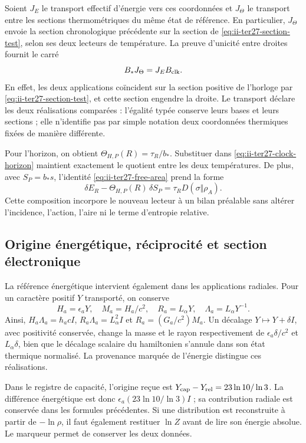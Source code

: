 Soient $J_E$ le transport effectif d’énergie vers ces coordonnées et
$J_\Theta$ le transport entre les sections thermométriques du même
état de référence. En particulier, $J_\Theta$ envoie la section
chronologique précédente sur la section de \eqref{eq:ii-ter27-section-test},
selon ses deux lecteurs de température. La preuve d’unicité entre droites
fournit le carré
\begin{equation}
 B_*J_\Theta=J_EB_{\rm clk}.
 \label{eq:ii-ter27-intertwiner}
\end{equation}
En effet, les deux applications coïncident sur la section positive de
l’horloge par \eqref{eq:ii-ter27-section-test}, et cette section engendre la droite.
Le transport déclare les deux réalisations comparées : l’égalité
typée conserve leurs bases et leurs sections ; elle n’identifie pas par simple
notation deux coordonnées thermiques fixées de manière différente.

Pour l’horizon, on obtient
$\Theta_{H,P}(R)=\tau_R/b_*$. Substituer dans
\eqref{eq:ii-ter27-clock-horizon} maintient exactement le quotient entre
les deux températures. De plus, avec $S_P=b_*s$, l’identité
\eqref{eq:ii-ter27-free-area} prend la forme
\[
 \delta E_R-\Theta_{H,P}(R)\,\delta S_P
 =\tau_RD(\sigma\Vert\rho_A).
\]
Cette composition incorpore le nouveau lecteur à un bilan préalable sans
altérer l’incidence, l’action, l’aire ni le terme d’entropie relative.

\subsection{Origine énergétique, réciprocité et section électronique}
\label{subsec:ii-ter27-electron}

La référence énergétique intervient également dans les applications radiales.
Pour un caractère positif $Y$ transporté, on conserve
\[
 H_a=\epsilon_aY,\quad M_a=H_a/c^2,\quad
 R_a=L_\alpha Y,\quad \Lambda_a=L_\alpha Y^{-1}.
\]
Ainsi, $H_a\Lambda_a=\hbar_acI$, $R_a\Lambda_a=L_\alpha^2I$ et
$R_a=(G_a/c^2)M_a$. Un décalage $Y\mapsto Y+\delta I$,
avec positivité conservée, change la masse et le rayon respectivement de
$\epsilon_a\delta/c^2$ et $L_\alpha\delta$, bien que le décalage
scalaire du hamiltonien s’annule dans son état thermique normalisé.
La provenance marquée de l’énergie distingue ces réalisations.

Dans le registre de capacité, l’origine reçue est
$Y_{\rm cap}-Y_{\rm rel}=23\ln10/\ln3$.
La différence énergétique est donc
$\epsilon_a(23\ln10/\ln3)I$ ; sa contribution radiale est conservée
dans les formules précédentes. Si une distribution est reconstruite à partir de
$-\ln\rho$, il faut également restituer $\ln Z$ avant de lire son énergie
absolue. Le marqueur permet de conserver les deux données.

